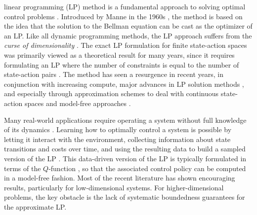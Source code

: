 \documentclass[journal,twoside,web]{ieeecolor}
\begin{document}
 linear programming (LP) method is a fundamental approach to solving optimal control problems \cite{LasserreDTMCP,BertsekasVol2}. Introduced by Manne in the 1960s \cite{ManneLP}, the method is based on the idea that the solution to the Bellman equation can be cast as the optimizer of an LP. Like all dynamic programming methods, the LP approach suffers from the \textit{curse of dimensionality} \cite{BellmanDP,bertsekas2019RL}. The exact LP formulation for finite state-action spaces was primarily viewed as a theoretical result for many years, since it requires formulating an LP where the number of constraints is equal to the number of state-action pairs \cite[Ch. 3.8]{PowellADP}. The method has seen a resurgence in recent years, in conjunction with increasing compute, major advances in LP solution methods \cite{BoydConvexOptimization}, and especially through approximation schemes to deal with continuous state-action spaces and model-free approaches \cite{SutterCDC2017,PaulADP,WangIteratedBellInequalities,SummersSumofSquares}.

Many real-world applications require operating a system without full knowledge of its dynamics \cite{SuttonRLanIntroduction}. Learning how to optimally control a system is possible by letting it interact with the environment, collecting information about state transitions and costs over time, and using the resulting data to build a sampled version of the LP \cite{RelaxedBellmanOp, MartinelliAffine, GoranADP}. This data-driven version of the LP is typically formulated in terms of the $Q$-function \cite{WatkinsQLearning,CogillDecentralizedADP}, so that the associated control policy can be computed in a model-free fashion. Most of the recent literature has shown encouraging results, particularly for low-dimensional systems. For higher-dimensional problems, the key obstacle is the lack of systematic boundedness guarantees for the approximate LP.

\end{document}
